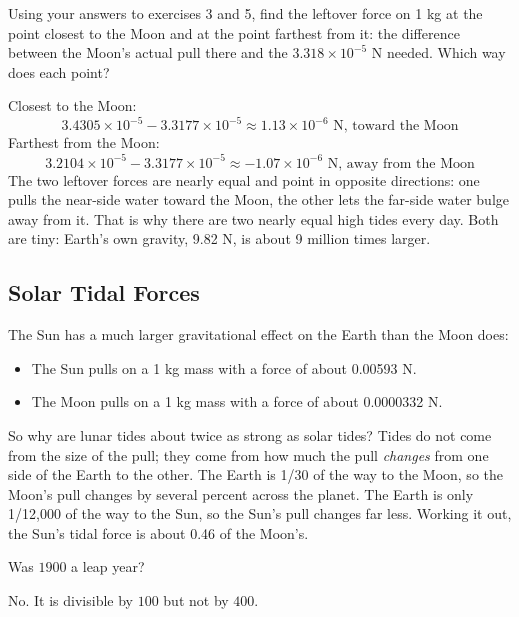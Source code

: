 \begin{Exercise}[title={Life Among the Orbits 6: The Tidal Force}, label=life-orbits6]
Using your answers to exercises 3 and 5, find the leftover force on 1 kg at
the point closest to the Moon and at the point farthest from it: the
difference between the Moon's actual pull there and the $3.318 \times
10^{-5}$ N needed. Which way does each point?
\end{Exercise}

\begin{Answer}[ref=life-orbits6]
Closest to the Moon:
$$3.4305 \times 10^{-5} - 3.3177 \times 10^{-5} \approx 1.13 \times 10^{-6} \text{ N, toward the Moon}$$
Farthest from the Moon:
$$3.2104 \times 10^{-5} - 3.3177 \times 10^{-5} \approx -1.07 \times 10^{-6} \text{ N, away from the Moon}$$
The two leftover forces are nearly equal and point in opposite directions:
one pulls the near-side water toward the Moon, the other lets the far-side
water bulge away from it. That is why there are two nearly equal high
tides every day. Both are tiny: Earth's own gravity, 9.82 N, is about 9
million times larger.
\end{Answer}

\subsection{Solar Tidal Forces}

The Sun has a much larger gravitational effect on the Earth than the Moon does:
\begin{itemize}
\item The Sun pulls on a 1 kg mass with a force of about 0.00593 N.
\item The Moon pulls on a 1 kg mass with a force of about 0.0000332 N.
\end{itemize}

So why are lunar tides about twice as strong as solar tides? Tides do not
come from the size of the pull; they come from how much the pull
\emph{changes} from one side of the Earth to the other. The Earth is 1/30
of the way to the Moon, so the Moon's pull changes by several percent
across the planet. The Earth is only 1/12,000 of the way to the Sun, so
the Sun's pull changes far less. Working it out, the Sun's tidal force is
about 0.46 of the Moon's.

\begin{Exercise}[title={The Year 1900}, label=tide7]
Was $1900$ a leap year?
\end{Exercise}
\begin{Answer}[ref=tide7]
No. It is divisible by $100$ but not by $400$.
\end{Answer}
